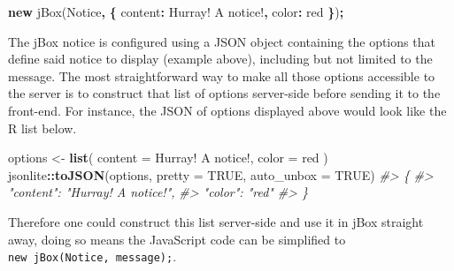\documentclass[
  10pt,
]{krantz}
\makeatletter
\newenvironment{Shaded}{\begin{snugshade}}{\end{snugshade}}
\newcommand{\AttributeTok}[1]{\textcolor[rgb]{0.61,0.61,0.61}{#1}}
\newcommand{\CommentTok}[1]{\textcolor[rgb]{0.37,0.37,0.37}{\textit{#1}}}
\newcommand{\DataTypeTok}[1]{\textcolor[rgb]{0.27,0.27,0.27}{#1}}
\newcommand{\KeywordTok}[1]{\textcolor[rgb]{0.27,0.27,0.27}{\textbf{#1}}}
\newcommand{\NormalTok}[1]{#1}
\newcommand{\OperatorTok}[1]{\textcolor[rgb]{0.43,0.43,0.43}{\textbf{#1}}}
\newcommand{\OtherTok}[1]{\textcolor[rgb]{0.37,0.37,0.37}{#1}}
\newcommand{\StringTok}[1]{\textcolor[rgb]{0.5,0.5,0.5}{#1}}
\newenvironment{kframe}{%
\medskip{}
\setlength{\fboxsep}{.8em}
 \def\at@end@of@kframe{}%
 \ifinner\ifhmode%
  \def\at@end@of@kframe{\end{minipage}}%
  \begin{minipage}{\columnwidth}%
 \fi\fi%
 \def\FrameCommand##1{\hskip\@totalleftmargin \hskip-\fboxsep
 \colorbox{shadecolor}{##1}\hskip-\fboxsep
     \hskip-\linewidth \hskip-\@totalleftmargin \hskip\columnwidth}%
 \MakeFramed {\advance\hsize-\width
   \@totalleftmargin\z@ \linewidth\hsize
   \@setminipage}}%
 {\par\unskip\endMakeFramed%
 \at@end@of@kframe}
\renewenvironment{Shaded}{\begin{kframe}}{\end{kframe}}
\makeatother
\begin{document}
\begin{Shaded}
\begin{Highlighting}[]
\KeywordTok{new} \AttributeTok{jBox}\NormalTok{(}\StringTok{\textquotesingle{}Notice\textquotesingle{}}\OperatorTok{,} \OperatorTok{\{}
  \DataTypeTok{content}\OperatorTok{:} \StringTok{\textquotesingle{}Hurray! A notice!\textquotesingle{}}\OperatorTok{,}
  \DataTypeTok{color}\OperatorTok{:} \StringTok{\textquotesingle{}red\textquotesingle{}}
\OperatorTok{\}}\NormalTok{)}\OperatorTok{;}
\end{Highlighting}
\end{Shaded}

The jBox notice is configured using a JSON object containing the options that define said notice to display (example above), including but not limited to the message. The most straightforward way to make all those options accessible to the server is to construct that list of options server-side before sending it to the front-end. For instance, the JSON of options displayed above would look like the R list below.

\begin{Shaded}
\begin{Highlighting}[]
\NormalTok{options <{-}}\StringTok{ }\KeywordTok{list}\NormalTok{(}
  \DataTypeTok{content =} \StringTok{\textquotesingle{}Hurray! A notice!\textquotesingle{}}\NormalTok{,}
  \DataTypeTok{color =} \StringTok{\textquotesingle{}red\textquotesingle{}}
\NormalTok{)}
\NormalTok{jsonlite}\OperatorTok{::}\KeywordTok{toJSON}\NormalTok{(options, }\DataTypeTok{pretty =} \OtherTok{TRUE}\NormalTok{, }\DataTypeTok{auto\_unbox =} \OtherTok{TRUE}\NormalTok{)}
\CommentTok{\#> \{}
\CommentTok{\#>   "content": "Hurray! A notice!",}
\CommentTok{\#>   "color": "red"}
\CommentTok{\#> \}}
\end{Highlighting}
\end{Shaded}

Therefore one could construct this list server-side and use it in jBox straight away, doing so means the JavaScript code can be simplified to \texttt{new\ jBox(\textquotesingle{}Notice\textquotesingle{},\ message);}.
\end{document}
